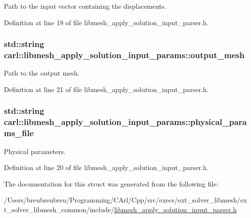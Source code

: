 Path to the input vector containing the displacements. 



Definition at line 18 of file libmesh\+\_\+apply\+\_\+solution\+\_\+input\+\_\+parser.\+h.

\hypertarget{structcarl_1_1libmesh__apply__solution__input__params_a02068cf34d7ddcd7500fff976e8b8950}{}
\subsubsection[{output\+\_\+mesh}]{\setlength{\rightskip}{0pt plus 5cm}std\+::string carl\+::libmesh\+\_\+apply\+\_\+solution\+\_\+input\+\_\+params\+::output\+\_\+mesh}\label{structcarl_1_1libmesh__apply__solution__input__params_a02068cf34d7ddcd7500fff976e8b8950}


Path to the output mesh. 



Definition at line 21 of file libmesh\+\_\+apply\+\_\+solution\+\_\+input\+\_\+parser.\+h.

\hypertarget{structcarl_1_1libmesh__apply__solution__input__params_af880101c2a6abd220f3493093fe46fcc}{}
\subsubsection[{physical\+\_\+params\+\_\+file}]{\setlength{\rightskip}{0pt plus 5cm}std\+::string carl\+::libmesh\+\_\+apply\+\_\+solution\+\_\+input\+\_\+params\+::physical\+\_\+params\+\_\+file}\label{structcarl_1_1libmesh__apply__solution__input__params_af880101c2a6abd220f3493093fe46fcc}


Physical parameters. 



Definition at line 20 of file libmesh\+\_\+apply\+\_\+solution\+\_\+input\+\_\+parser.\+h.



The documentation for this struct was generated from the following file\+:\begin{DoxyCompactItemize}
\item 
/\+Users/breubreubreu/\+Programming/\+C\+Arl/\+Cpp/src/execs/ext\+\_\+solver\+\_\+libmesh/ext\+\_\+solver\+\_\+libmesh\+\_\+common/include/\hyperlink{libmesh__apply__solution__input__parser_8h}{libmesh\+\_\+apply\+\_\+solution\+\_\+input\+\_\+parser.\+h}\end{DoxyCompactItemize}
